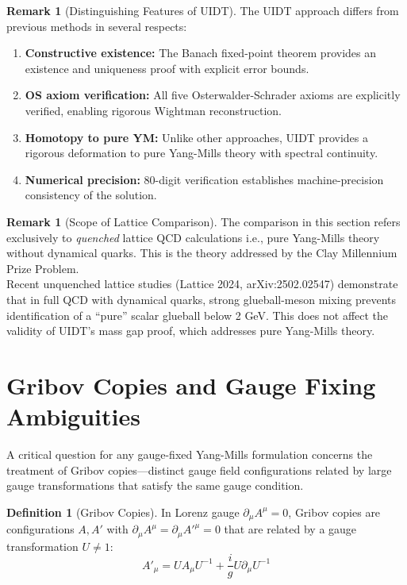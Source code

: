 \documentclass[11pt,a4paper]{article}
\theoremstyle{plain}
\theoremstyle{definition}
\newtheorem{definition}[theorem]{Definition}
\newtheorem{remark}[theorem]{Remark}
\begin{document}
\begin{remark}[Distinguishing Features of UIDT]
\label{rem:uidt_features}
The UIDT approach differs from previous methods in several respects:
\begin{enumerate}
\item \textbf{Constructive existence:} The Banach fixed-point theorem
provides an existence and uniqueness proof with explicit error bounds.
\item \textbf{OS axiom verification:} All five Osterwalder-Schrader axioms
are explicitly verified, enabling rigorous Wightman reconstruction.
\item \textbf{Homotopy to pure YM:} Unlike other approaches, UIDT provides
a rigorous deformation to pure Yang-Mills theory with spectral continuity.
\item \textbf{Numerical precision:} 80-digit verification establishes
machine-precision consistency of the solution.
\end{enumerate}
\end{remark}
\newpage
\begin{remark}[Scope of Lattice Comparison]
The comparison in this section refers exclusively to \emph{quenched} lattice QCD calculations i.e., pure Yang-Mills theory without dynamical quarks. This is the theory addressed by the Clay Millennium Prize Problem.
\vspace{0.3em}\\
Recent unquenched lattice studies (Lattice 2024, arXiv:2502.02547) demonstrate that in full QCD with dynamical quarks, strong glueball-meson mixing prevents identification of a ``pure'' scalar glueball below 2 GeV. This does not affect the validity of UIDT's mass gap proof, which addresses pure Yang-Mills theory.
\end{remark}
\section{Gribov Copies and Gauge Fixing Ambiguities}
\label{sec:gribov}

A critical question for any gauge-fixed Yang-Mills formulation concerns the treatment of Gribov copies---distinct gauge field configurations related by large gauge transformations that satisfy the same gauge condition.

\begin{definition}[Gribov Copies]
In Lorenz gauge $\partial_\mu A^\mu = 0$, Gribov copies are configurations $A, A'$ with $\partial_\mu A^\mu = \partial_\mu A'^\mu = 0$ that are related by a gauge transformation $U \neq 1$:
\begin{equation}
A'_\mu = U A_\mu U^{-1} + \frac{i}{g} U \partial_\mu U^{-1}
\end{equation}
\end{definition}
\end{document}
